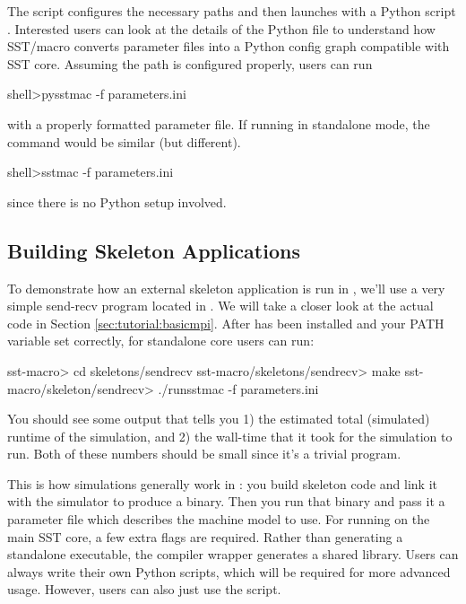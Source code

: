The script configures the necessary paths and then launches with a Python script .  Interested users can look at the details of the Python file to understand how SST/macro converts parameter files into a Python config graph compatible with SST core.
Assuming the path is configured properly, users can run

\begin{ShellCmd}
shell>pysstmac -f parameters.ini
\end{ShellCmd}
with a properly formatted parameter file. If running in standalone mode, the command would be similar (but different).

\begin{ShellCmd}
shell>sstmac -f parameters.ini
\end{ShellCmd}
since there is no Python setup involved.

\subsection{Building Skeleton Applications}
\label{sec:tutorial:runapp}

To demonstrate how an external skeleton application is run in \sstmacro, we'll use a very simple send-recv program located in .
We will take a closer look at the actual code in Section \ref{sec:tutorial:basicmpi}.
After \sstmacro has been installed and your PATH variable set correctly, for standalone core users can run:

\begin{ShellCmd}
sst-macro> cd skeletons/sendrecv
sst-macro/skeletons/sendrecv> make
sst-macro/skeleton/sendrecv> ./runsstmac -f parameters.ini
\end{ShellCmd}

You should see some output that tells you 1) the estimated total (simulated) runtime of the simulation, and 
2) the wall-time that it took for the simulation to run.  
Both of these numbers should be small since it's a trivial program. 

This is how simulations generally work in \sstmacro: you build skeleton code and link it with the simulator to produce a binary.  
Then you run that binary and pass it a parameter file which describes the machine model to use.  For running on the main SST core, a few extra flags are required.  Rather than generating a standalone executable, the compiler wrapper generates a shared library. Users can always write their own Python scripts, which will be required for more advanced usage. However, users can also just use the  script.

